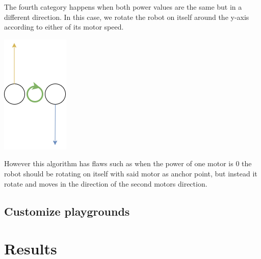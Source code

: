 \documentclass{scrbook}
\begin{document}
The fourth category happens when both power values are the same but in a different direction. In this case, we rotate the robot on itself around the y-axis according to either of its motor speed.
\begin{center}
  \includegraphics[scale=1]{./move_spdd}
\end{center}

However this algorithm has flaws such as when the power of one motor is 0 the robot should be rotating on itself with said motor as anchor point, but instead it rotate and moves in the direction of the second motors direction.

\section{Customize playgrounds}

\chapter{Results}





                
\end{document}
